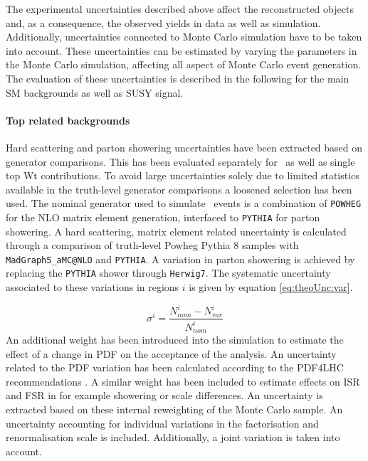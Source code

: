 
The experimental uncertainties described above affect the reconstructed objects and,  as a consequence,  the observed yields in data as well as simulation.  Additionally,  uncertainties connected to Monte Carlo simulation have to be taken into account.
These uncertainties can be estimated by varying the parameters in the Monte Carlo simulation,  affecting all aspect of Monte Carlo event generation. The evaluation of these uncertainties is described in the following for the main \ac{SM} backgrounds as well as \ac{SUSY} signal.  

\paragraph{Top related backgrounds}
Hard scattering and parton showering uncertainties have been extracted based on generator comparisons.  This has been evaluated separately for \ttbar\ as well as single top Wt contributions.  To avoid large uncertainties solely due to limited statistics available in the truth-level generator comparisons a loosened selection has been used.  
The nominal generator used to simulate \ttbar\ events is a combination of \texttt{POWHEG} for the \ac{NLO} matrix element generation,  interfaced to \texttt{PYTHIA} for parton showering. 
A hard scattering,  matrix element related uncertainty is calculated through a comparison of truth-level Powheg Pythia 8 samples with \texttt{MadGraph5\_aMC@NLO} and \texttt{PYTHIA}.  
A variation in parton showering is achieved by replacing the \texttt{PYTHIA} shower through \texttt{Herwig7}.
The systematic uncertainty associated to these variations in regions $i$ is given by equation \ref{eq:theoUnc:var}.

\begin{equation}
\sigma^i = \frac{N_{nom}^i-N_{var}^i}{N_{nom}^i}
\label{eq:theoUnc:var}
\end{equation}
An additional weight has been introduced into the simulation to estimate the effect of a change in \ac{PDF} on the acceptance of the analysis.  An uncertainty related to the PDF variation has been calculated according to the PDF4LHC recommendations \cite{PDF4LHC}.  A similar weight has been included to estimate effects on \ac{ISR} and \ac{FSR} in for example showering or scale differences.  An uncertainty is extracted based on these internal reweighting of the Monte Carlo sample. 
An uncertainty accounting for individual variations in the factorisation and renormalisation scale is included.  Additionally,  a joint variation is taken into account.


